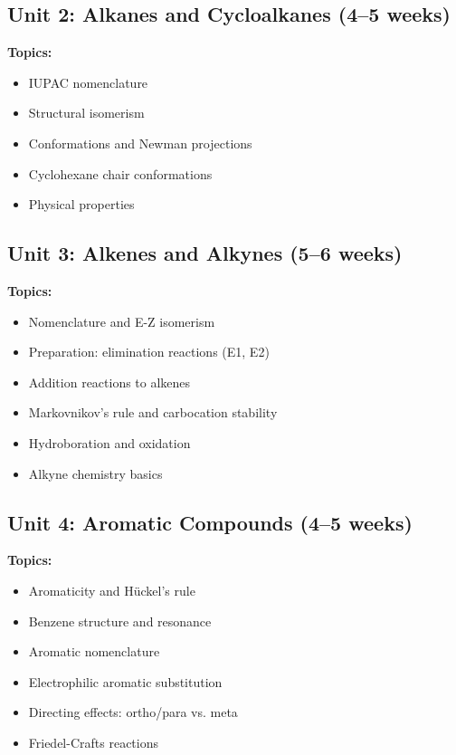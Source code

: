 \documentclass[12pt,oneside]{book}
\begin{document}
\subsection{Unit 2: Alkanes and Cycloalkanes (4--5 weeks)}

\textbf{Topics:}
\begin{itemize}
    \item IUPAC nomenclature
    \item Structural isomerism
    \item Conformations and Newman projections
    \item Cyclohexane chair conformations
    \item Physical properties
\end{itemize}

\subsection{Unit 3: Alkenes and Alkynes (5--6 weeks)}

\textbf{Topics:}
\begin{itemize}
    \item Nomenclature and E-Z isomerism
    \item Preparation: elimination reactions (E1, E2)
    \item Addition reactions to alkenes
    \item Markovnikov's rule and carbocation stability
    \item Hydroboration and oxidation
    \item Alkyne chemistry basics
\end{itemize}

\subsection{Unit 4: Aromatic Compounds (4--5 weeks)}

\textbf{Topics:}
\begin{itemize}
    \item Aromaticity and Hückel's rule
    \item Benzene structure and resonance
    \item Aromatic nomenclature
    \item Electrophilic aromatic substitution
    \item Directing effects: ortho/para vs. meta
    \item Friedel-Crafts reactions
\end{itemize}
\end{document}
